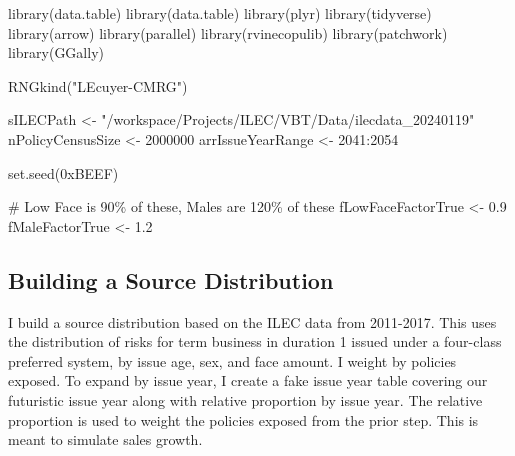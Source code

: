 \documentclass[
  letterpaper,
  DIV=11,
  numbers=noendperiod]{scrartcl}
\newenvironment{Shaded}{\begin{snugshade}}{\end{snugshade}}
\newcommand{\CommentTok}[1]{\textcolor[rgb]{0.37,0.37,0.37}{#1}}
\newcommand{\DecValTok}[1]{\textcolor[rgb]{0.68,0.00,0.00}{#1}}
\newcommand{\FloatTok}[1]{\textcolor[rgb]{0.68,0.00,0.00}{#1}}
\newcommand{\FunctionTok}[1]{\textcolor[rgb]{0.28,0.35,0.67}{#1}}
\newcommand{\NormalTok}[1]{\textcolor[rgb]{0.00,0.23,0.31}{#1}}
\newcommand{\OtherTok}[1]{\textcolor[rgb]{0.00,0.23,0.31}{#1}}
\newcommand{\SpecialCharTok}[1]{\textcolor[rgb]{0.37,0.37,0.37}{#1}}
\newcommand{\StringTok}[1]{\textcolor[rgb]{0.13,0.47,0.30}{#1}}
\begin{document}
\begin{Shaded}
\begin{Highlighting}[]
\FunctionTok{library}\NormalTok{(data.table)}
\FunctionTok{library}\NormalTok{(data.table)}
\FunctionTok{library}\NormalTok{(plyr)}
\FunctionTok{library}\NormalTok{(tidyverse)}
\FunctionTok{library}\NormalTok{(arrow)}
\FunctionTok{library}\NormalTok{(parallel)}
\FunctionTok{library}\NormalTok{(rvinecopulib)}
\FunctionTok{library}\NormalTok{(patchwork)}
\FunctionTok{library}\NormalTok{(GGally)}

\FunctionTok{RNGkind}\NormalTok{(}\StringTok{"L\textquotesingle{}Ecuyer{-}CMRG"}\NormalTok{)}



\NormalTok{sILECPath }\OtherTok{\textless{}{-}} \StringTok{"/workspace/Projects/ILEC/VBT/Data/ilecdata\_20240119"}
\NormalTok{nPolicyCensusSize }\OtherTok{\textless{}{-}} \DecValTok{2000000}
\NormalTok{arrIssueYearRange }\OtherTok{\textless{}{-}} \DecValTok{2041}\SpecialCharTok{:}\DecValTok{2054}

\FunctionTok{set.seed}\NormalTok{(}\DecValTok{0xBEEF}\NormalTok{)}

\CommentTok{\# Low Face is 90\% of these, Males are 120\% of these}
\NormalTok{fLowFaceFactorTrue }\OtherTok{\textless{}{-}} \FloatTok{0.9}
\NormalTok{fMaleFactorTrue }\OtherTok{\textless{}{-}} \FloatTok{1.2}
\end{Highlighting}
\end{Shaded}

\hypertarget{building-a-source-distribution}{%
\subsection{Building a Source
Distribution}\label{building-a-source-distribution}}

I build a source distribution based on the ILEC data from 2011-2017.
This uses the distribution of risks for term business in duration 1
issued under a four-class preferred system, by issue age, sex, and face
amount. I weight by policies exposed. To expand by issue year, I create
a fake issue year table covering our futuristic issue year along with
relative proportion by issue year. The relative proportion is used to
weight the policies exposed from the prior step. This is meant to
simulate sales growth.
\end{document}
